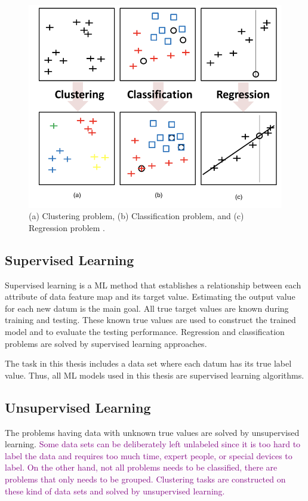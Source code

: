 \begin{figure}[h]
	\centering
	\includegraphics[width=.8\linewidth]{fig/clustering_classification_regression.png}
	\caption{(a) Clustering problem, (b) Classification problem, and (c) Regression problem \cite{parallel_linear_algebra}.}
	\label{clustering_classification_regression}
\end{figure}

\subsection{Supervised Learning}

Supervised learning is a ML method that establishes a relationship between each attribute of data feature map and its target value. Estimating the output value for each new datum is the main goal. All true target values are known during training and testing. These known true values are used to construct the trained model and to evaluate the testing performance. Regression and classification problems are solved by supervised learning approaches.

The task in this thesis includes a data set where each datum has its true label value. Thus, all ML models used in this thesis are supervised learning algorithms.

\subsection{Unsupervised Learning}

The problems having data with unknown true values are solved by unsupervised learning. \textcolor{purple}{Some data sets can be deliberately left unlabeled since it is too hard to label the data and requires too much time, expert people, or special devices to label. On the other hand, not all problems needs to be classified, there are problems that only needs to be grouped. Clustering tasks are constructed on these kind of data sets and solved by unsupervised learning.}

